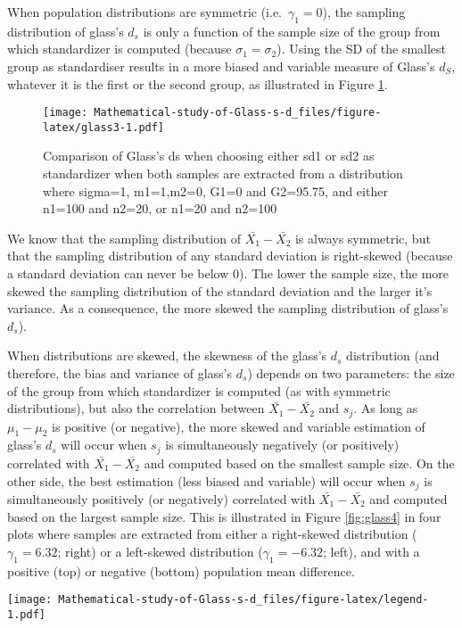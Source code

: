 \documentclass[
  man,floatsintext]{apa6}
\begin{document}
When population distributions are symmetric (i.e.~\(\gamma_1=0\)), the sampling distribution of glass's \(d_s\) is only a function of the sample size of the group from which standardizer is computed (because \(\sigma_1=\sigma_2\)). Using the SD of the smallest group as standardiser results in a more biased and variable measure of Glass's \(d_S\), whatever it is the first or the second group, as illustrated in Figure \ref{fig:glass3}.

\begin{figure}
\centering
\texttt{[image: Mathematical-study-of-Glass-s-d\_files/figure-latex/glass3-1.pdf]}
\caption{\label{fig:glass3}Comparison of Glass's ds when choosing either sd1 or sd2 as standardizer when both samples are extracted from a distribution where sigma=1, m1=1,m2=0, G1=0 and G2=95.75, and either n1=100 and n2=20, or n1=20 and n2=100}
\end{figure}

We know that the sampling distribution of \(\bar{X_1}-\bar{X_2}\) is always symmetric, but that the sampling distribution of any standard deviation is right-skewed (because a standard deviation can never be below 0). The lower the sample size, the more skewed the sampling distribution of the standard deviation and the larger it's variance. As a consequence, the more skewed the sampling distribution of glass's \(d_s\)).

When distributions are skewed, the skewness of the glass's \(d_s\) distribution (and therefore, the bias and variance of glass's \(d_s\)) depends on two parameters: the size of the group from which standardizer is computed (as with symmetric distributions), but also the correlation between \(\bar{X_1}-\bar{X_2}\) and \(s_j\). As long as \(\mu_1-\mu_2\) is positive (or negative), the more skewed and variable estimation of glass's \(d_s\) will occur when \(s_j\) is simultaneously negatively (or positively) correlated with \(\bar{X_1}-\bar{X_2}\) and computed based on the smallest sample size. On the other side, the best estimation (less biased and variable) will occur when \(s_j\) is simultaneously positively (or negatively) correlated with \(\bar{X_1}-\bar{X_2}\) and computed based on the largest sample size. This is illustrated in Figure \ref{fig:glass4} in four plots where samples are extracted from either a right-skewed distribution (\(\gamma_1=6.32\); right) or a left-skewed distribution (\(\gamma_1=-6.32\); left), and with a positive (top) or negative (bottom) population mean difference.

\texttt{[image: Mathematical-study-of-Glass-s-d\_files/figure-latex/legend-1.pdf]}
\end{document}
